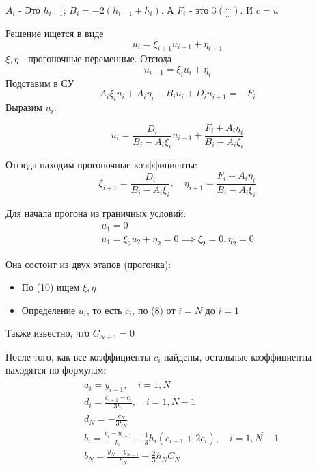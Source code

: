 $A_i$ - Это  $h_{i-1}$; $B_i = -2(h_{i-1} + h_i)$. А $F_i$ - это  $3(\frac{\ldots}{\ldots})$.
И $c = u$

\medskip

Решение ищется в виде
\begin{equation}
u_i = \xi_{i+1}u_{i+1} + \eta_{i+1}
\end{equation}
$\xi, \eta$ - прогоночные переменные. Отсюда
 \[
u_{i-1} = \xi_{i}u_i + \eta_i
\]
Подставим в СУ
\[
A_i\xi_iu_i + A_i\eta_i - B_iu_i + D_iu_{i+1} = -F_i
\]
Выразим $u_i$:

\begin{equation}
u_i = \frac{D_i}{B_i - A_i\xi_i}u_{i+1} + \frac{F_i + A_i\eta_i}{B_i - A_i\xi_i}
\end{equation}

Отсюда находим прогоночные коэффициенты:
\begin{equation}
    \xi_{i+1} = \frac{D_i}{B_i - A_i\xi_i}, \quad \eta_{i+1} = 
    \frac{F_i + A_i\eta_i}{B_i - A_i\xi_i}
\end{equation}

Для начала прогона из граничных условий:
\begin{gather*}
    u_1=0\\
    u_1=\xi_2u_2 + \eta_2 = 0 \implies \xi_2 = 0, \eta_2 = 0
\end{gather*}

Она состоит из двух этапов (прогонка):
\begin{itemize}
    \item По (10) ищем $\xi, \eta$
    \item Определение  $u_i$, то есть  $c_i$, по (8) от $i=N$ до  $i = 1$
\end{itemize}
Также известно, что $C_{N+1} = 0$


\medskip

После того, как все коэффициенты $c_i$ найдены, остальные коэффициенты находятся по формулам:
 \begin{align*}
    &a_i = y_{i-1},\quad i=\overline{1,N}\\
    &d_i = \frac{c_{i+1} - c_i}{3h_i},\quad i = \overline{1,N-1}\\
    &d_{N} = - \frac{c_{N}}{3h_{N}}\\
    &b_i = \frac{y_{i} - y_{i-1}}{h_i} - \frac{1}{3}h_i(c_{i+1} + 2c_i), \quad i = \overline{1,N-1}\\
    &b_{N} = \frac{y_{N} - y_{N-1}}{h_{N}} - \frac{2}{3}h_{N}C_{N}\\
\end{align*}

